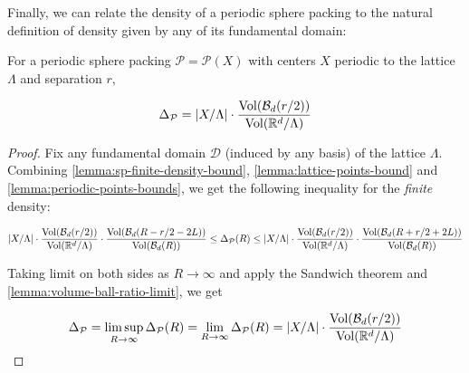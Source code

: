 Finally, we can relate the density of a periodic sphere packing to the natural definition of density given by any of its fundamental domain:

\begin{theorem}\label{theorem:psp-density}\leanok
  For a periodic sphere packing $\mathcal{P} = \mathcal{P}(X)$ with centers $X$ periodic to the lattice $\Lambda$ and separation $r$,

  \[
    \Delta_{\mathcal{P}} = |X / \Lambda| \cdot \frac{\operatorname{Vol}\!\left(\mathcal{B}_d(r / 2)\right)}{\operatorname{Vol}\!\left(\mathbb{R}^d / \Lambda\right)}
  \]
\end{theorem}
\begin{proof}
  Fix any fundamental domain $\mathcal{D}$ (induced by any basis) of the lattice $\Lambda$. Combining \cref{lemma:sp-finite-density-bound}, \cref{lemma:lattice-points-bound} and \cref{lemma:periodic-points-bounds}, we get the following inequality for the \textit{finite} density:

  \[
    |X / \Lambda| \cdot \frac{\Vol{\mathcal{B}_d(r / 2)}}{\Vol{\R^d / \Lambda}} \cdot \frac{\Vol{\mathcal{B}_d(R - r / 2 - 2L)}}{\Vol{\mathcal{B}_d(R)}}
    \leq \Delta_{\mathcal{P}}(R)
    \leq |X / \Lambda| \cdot \frac{\Vol{\mathcal{B}_d(r / 2)}}{\Vol{\R^d / \Lambda}} \cdot \frac{\Vol{\mathcal{B}_d(R + r / 2 + 2L)}}{\Vol{\mathcal{B}_d(R)}}
  \]

  Taking limit on both sides as $R \to \infty$ and apply the Sandwich theorem and \cref{lemma:volume-ball-ratio-limit}, we get

  \[
    \Delta_{\mathcal{P}} = \limsup_{R \to \infty} \Delta_{\mathcal{P}}(R) = \lim_{R \to \infty} \Delta_{\mathcal{P}}(R) = |X / \Lambda| \cdot \frac{\operatorname{Vol}\!\left(\mathcal{B}_d(r / 2)\right)}{\operatorname{Vol}\!\left(\mathbb{R}^d / \Lambda\right)}
  \]
\end{proof}
